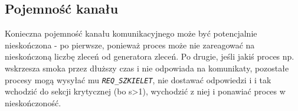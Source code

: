 \documentclass[12pt]{article}
\newcommand{\msg}[1]{\texttt{\emph{#1}}}
\begin{document}
\subsection{Pojemność kanału}
Konieczna pojemność kanału komunikacyjnego może być potencjalnie nieskończona - po pierwsze, ponieważ proces może nie zareagować na nieskończoną liczbę zleceń od generatora zleceń. Po drugie, jeśli jakiś proces np. wskrzesza smoka przez dłuższy czas i nie odpowiada na komunikaty, pozostałe procesy mogą wysyłać mu \msg{REQ\_SZKIELET}, nie dostawać odpowiedzi i i tak wchodzić do sekcji krytycznej (bo s>1), wychodzić z niej i ponawiać proces w nieskończoność. 
\end{document}
